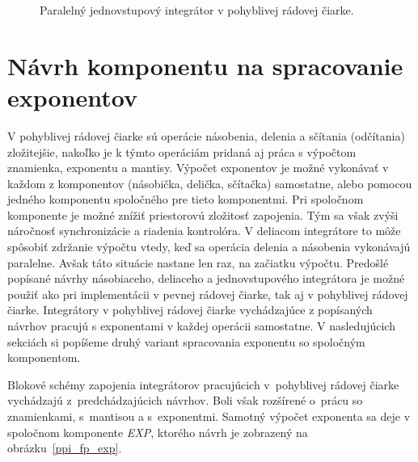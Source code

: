 \bigskip
\begin{figure}[h]
\centering
{}
\caption{Paralelný jednovstupový integrátor v pohyblivej rádovej čiarke.}
\label{ppi_fp}
\end{figure}
\bigskip

\section{Návrh komponentu na spracovanie exponentov}
V pohyblivej rádovej čiarke sú operácie násobenia, delenia a sčítania (odčítania) zložitejšie, nakoľko je k týmto operáciám pridaná aj práca s výpočtom znamienka, exponentu a mantisy. Výpočet exponentov je možné vykonávať v každom z komponentov (násobička, delička, sčítačka) samostatne, alebo pomocou jedného komponentu spoločného pre tieto komponentmi. Pri spoločnom komponente je možné znížiť priestorovú zložitosť zapojenia. Tým sa však zvýši  náročnosť synchronizácie a riadenia kontrolóra. V deliacom integrátore to môže spôsobiť zdržanie výpočtu vtedy, keď sa operácia delenia a násobenia vykonávajú paralelne. Avšak táto situácie nastane len raz, na začiatku výpočtu. Predošlé popísané návrhy násobiaceho, deliaceho a jednovstupového integrátora je možné použiť ako pri implementácii v pevnej rádovej čiarke, tak aj v pohyblivej rádovej čiarke. Integrátory v pohyblivej rádovej čiarke vychádzajúce z popísaných návrhov pracujú s exponentami v každej operácii samostatne.
V nasledujúcich sekciách si popíšeme druhý variant spracovania exponentu so spoločným komponentom.

Blokové schémy zapojenia integrátorov pracujúcich v~pohyblivej rádovej čiarke vychádzajú z~predchádzajúcich návrhov. Boli však rozšírené o~prácu so znamienkami, s~mantisou a s~exponentmi. Samotný výpočet exponenta sa deje v spoločnom komponente \textit{EXP}, ktorého návrh je zobrazený na obrázku~\ref{ppi_fp_exp}.

